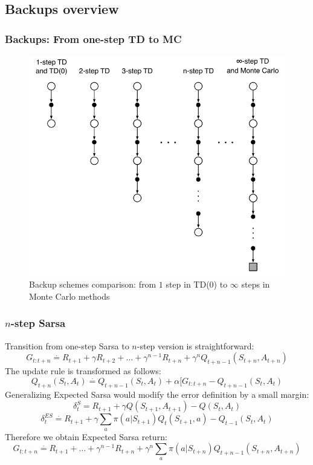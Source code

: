 \documentclass{beamer}
\begin{document}
\subsection{Backups overview}

\begin{frame}
  \frametitle{Backups: From one-step TD to MC}
  \begin{figure}
    \centering
    \includegraphics[height=0.7 \textheight]{one_step_to_multi_step}
    \caption{Backup schemes comparison: from $1$ step in TD(0) to $\infty$
      steps in Monte Carlo methods}
  \end{figure}
\end{frame}

\begin{frame}
  \frametitle{$n$-step Sarsa}
  Transition from one-step Sarsa to $n$-step version is straightforward:
  $$G_{t : t + n} \overset{\cdot}{=} R_{t + 1} + \gamma R_{t + 2} + \ldots +
    \gamma^{n -1} R_{t + n} + \gamma^n Q_{t + n - 1}(S_{t + n}, A_{t + n})$$
  The update rule is transformed as follows:
  $$Q_{t + n}(S_t, A_t) \overset{\cdot}{=} Q_{t + n - 1}(S_t, A_t) +
    \alpha [G_{t : t + n} - Q_{t + n - 1}(S_t, A_t)$$
  Generalizing Expected Sarsa would modify the error definition by a small
  margin:
  $$\delta^{S}_t = R_{t + 1} + \gamma Q(S_{t + 1}, A_{t + 1}) - Q(S_t, A_t)$$
  $$\delta^{ES}_t \overset{\cdot}{=} R_{t + 1} +
    \gamma \sum_{a} \pi(a | S_{t + 1}) Q_t(S_{t + 1}, a) - Q_{t - 1}(S_t, A_t)$$
  Therefore we obtain Expected Sarsa return:
  $$G_{t : t + n} \overset{\cdot}{=} R_{t + 1} + \ldots +
    \gamma^{n -1} R_{t + n} + \gamma^n \sum_{a} \pi(a | S_{t + n})
      Q_{t + n - 1}(S_{t + n}, A_{t + n})$$
\end{frame}
\end{document}
